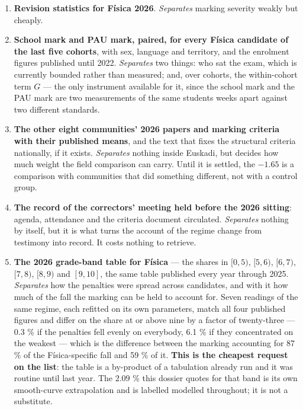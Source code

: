 \documentclass[
  10.5pt,
  a4paper,
  DIV=11,
  numbers=noendperiod]{scrartcl}
\begin{document}
\begin{enumerate}
  \textbf{July 2026 Física}: presented, passed, mean. \emph{Separates}
  whether the June pitch was that paper or the 2026 marking.
\item
  \textbf{Revision statistics for Física 2026}. \emph{Separates} marking
  severity weakly but cheaply.
\item
  \textbf{School mark and PAU mark, paired, for every Física candidate
  of the last five cohorts}, with sex, language and territory, and the
  enrolment figures published until 2022. \emph{Separates} two things:
  who sat the exam, which is currently bounded rather than measured;
  and, over cohorts, the within-cohort term \(G\) --- the only
  instrument available for it, since the school mark and the PAU mark
  are two measurements of the same students weeks apart against two
  different standards.
\item
  \textbf{The other eight communities' 2026 papers and marking criteria
  with their published means}, and the text that fixes the structural
  criteria nationally, if it exists. \emph{Separates} nothing inside
  Euskadi, but decides how much weight the field comparison can carry.
  Until it is settled, the \(-1.65\) is a comparison with communities
  that did something different, not with a control group.
\item
  \textbf{The record of the correctors' meeting held before the 2026
  sitting}: agenda, attendance and the criteria document circulated.
  \emph{Separates} nothing by itself, but it is what turns the account
  of the regime change from testimony into record. It costs nothing to
  retrieve.
\item
  \textbf{The 2026 grade-band table for Física} --- the shares in
  \([0,5)\), \([5,6)\), \([6,7)\), \([7,8)\), \([8,9)\) and \([9,10]\),
  the same table published every year through 2025. \emph{Separates} how
  the penalties were spread across candidates, and with it how much of
  the fall the marking can be held to account for. Seven readings of the
  same regime, each refitted on its own parameters, match all four
  published figures and differ on the share at or above nine by a factor
  of twenty-three --- 0.3 \% if the penalties fell evenly on everybody,
  6.1 \% if they concentrated on the weakest --- which is the difference
  between the marking accounting for 87 \% of the Física-specific fall
  and 59 \% of it. \textbf{This is the cheapest request on the list}:
  the table is a by-product of a tabulation already run and it was
  routine until last year. The \(2.09\) \% this dossier quotes for that
  band is its own smooth-curve extrapolation and is labelled modelled
  throughout; it is not a substitute.
\end{enumerate}
\end{document}
